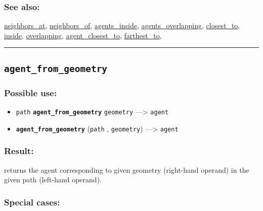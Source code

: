 \documentclass[]{book}
\providecommand{\tightlist}{%
  \setlength{\itemsep}{0pt}\setlength{\parskip}{0pt}}
\theoremstyle{definition}
\theoremstyle{definition}
\theoremstyle{definition}
\theoremstyle{remark}
\begin{document}
\subsubsection{See also:}\label{see-also-19}

\href{OperatorsNR\#neighbors_at}{neighbors\_at},
\href{OperatorsNR\#neighbors_of}{neighbors\_of},
\href{OperatorsAA\#agents_inside}{agents\_inside},
\href{OperatorsAA\#agents_overlapping}{agents\_overlapping},
\href{OperatorsBC\#closest_to}{closest\_to},
\href{OperatorsIM\#inside}{inside},
\href{OperatorsNR\#overlapping}{overlapping},
\href{OperatorsAA\#agent_closest_to}{agent\_closest\_to},
\href{OperatorsDH\#farthest_to}{farthest\_to},

\begin{center}\rule{0.5\linewidth}{\linethickness}\end{center}

\subsection{\texorpdfstring{\texttt{agent\_from\_geometry}}{agent\_from\_geometry}}\label{agent_from_geometry}

\subsubsection{Possible use:}\label{possible-use-28}

\begin{itemize}
\tightlist
\item
  \texttt{path} \textbf{\texttt{agent\_from\_geometry}}
  \texttt{geometry} ---\textgreater{} \texttt{agent}
\item
  \textbf{\texttt{agent\_from\_geometry}} (\texttt{path} ,
  \texttt{geometry}) ---\textgreater{} \texttt{agent}
\end{itemize}

\subsubsection{Result:}\label{result-27}

returns the agent corresponding to given geometry (right-hand operand)
in the given path (left-hand operand).

\subsubsection{Special cases:}\label{special-cases-14}
\end{document}
